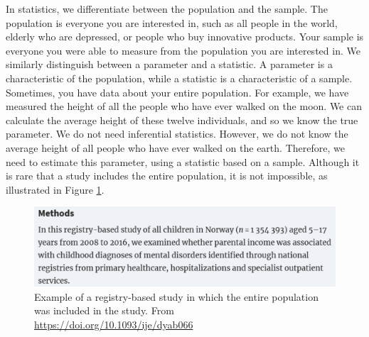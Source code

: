 \documentclass[
  oneside]{book}
\begin{document}
In statistics, we differentiate between the population and the sample. The population is everyone you are interested in, such as all people in the world, elderly who are depressed, or people who buy innovative products. Your sample is everyone you were able to measure from the population you are interested in. We similarly distinguish between a parameter and a statistic. A parameter is a characteristic of the population, while a statistic is a characteristic of a sample. Sometimes, you have data about your entire population. For example, we have measured the height of all the people who have ever walked on the moon. We can calculate the average height of these twelve individuals, and so we know the true parameter. We do not need inferential statistics. However, we do not know the average height of all people who have ever walked on the earth. Therefore, we need to estimate this parameter, using a statistic based on a sample. Although it is rare that a study includes the entire population, it is not impossible, as illustrated in Figure \ref{fig:population}.



\begin{figure}

{\centering \includegraphics[width=1\linewidth]{images/population} 

}

\caption{Example of a registry-based study in which the entire population was included in the study. From \url{https://doi.org/10.1093/ije/dyab066}}\label{fig:population}
\end{figure}
\end{document}
